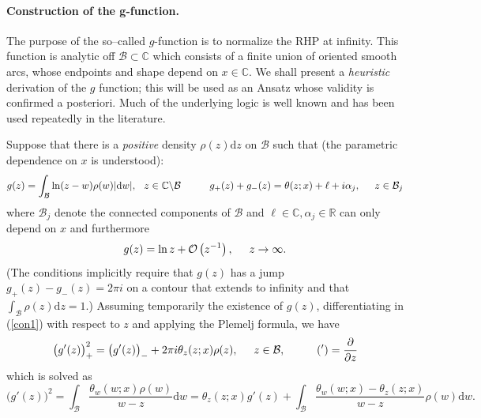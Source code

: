 \documentclass[10pt,oneside,reqno]{amsart}
\numberwithin{equation}{section}
\renewcommand{\d}{{\mathrm d}}
\def\eqref#1{(\ref{#1})}
\begin{document}
\paragraph{\bf Construction of the g-function.} The purpose of the so--called $g$-function is to normalize the RHP at infinity. This function is analytic off  $\mathcal{B}\subset\mathbb{C}$ which consists of a finite union of oriented smooth arcs, whose endpoints and shape  depend on $x\in\mathbb{C}$. 
We shall present a {\em heuristic} derivation of the $g$ function; this will be used as an Ansatz whose validity is confirmed a posteriori. Much of the underlying logic is well known and has been used repeatedly in the literature.

Suppose that there is a {\em positive} density $\rho(z) \d z$ on $\mathcal B$ such that  (the parametric dependence on $x$ is understood):
\begin{equation}\label{con1}
  g(z) = \int_{\mathcal{B}}\ln(z-w)\rho(w)|\d w|,\hspace{0.25cm}z\in\mathbb{C}\backslash\mathcal{B}\hspace{1cm} g_+(z)+g_-(z) =\theta(z;x)+\ell+i\alpha_j,\hspace{0.5cm}z\in\mathcal{B}_j
\end{equation}
where $\mathcal B_j$ denote the connected components of $\mathcal B$ and  $\ell\in\mathbb{C},\alpha_j\in\mathbb{R}$ can only depend on $x$ and furthermore
\begin{equation}\label{gfuncasy}
  g(z)=\ln z+\mathcal O\left(z^{-1}\right),\hspace{0.5cm}z\rightarrow\infty.
\end{equation}
(The conditions implicitly require that $g(z)$ has a jump $g_+(z) - g_-(z) =2\pi i$ on a contour that extends to infinity and that $\int_{\mathcal B} \rho(z)\d z =1$.)
Assuming temporarily the existence of $g(z)$, differentiating in \eqref{con1} with respect to $z$ and applying the Plemelj formula, we have
\begin{equation*}
  \big(g'(z)\big)^2_+=\big(g'(z)\big)_-+2\pi i\theta_{z}(z;x)\rho(z),\hspace{0.5cm}z\in\mathcal{B},\hspace{1cm} (')=\frac{\partial}{\partial z}
\end{equation*}
which is solved as
\begin{equation}\label{gcurve}
  \big(g'(z)\big)^2 = \int_{\mathcal{B}}\frac{\theta_{w}(w;x)\rho(w)}{w-z}\d w = \theta_{z}(z;x)g'(z)+
  \int_{\mathcal{B}}\frac{\theta_{w}(w;x)-\theta_{z}(z;x)}{w-z}\rho(w)\d w.
\end{equation}
\end{document}
